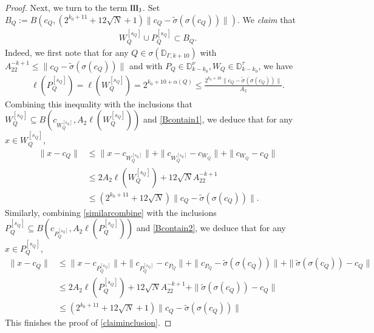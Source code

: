 \documentclass[12pt]{amsart}
\begin{document}
\begin{proof}
Next, we turn to the term ${\rm III}_3$. Set $B_Q:=B(c_Q,(2^{k_0+11}+12\sqrt{N}+1)\|c_Q-\widetilde{\sigma}(\sigma(c_Q))\|)$. We {\it claim} that
\begin{align}\label{claiminclusion}
  W_Q^{[s_Q]}\cup P_Q^{[s_Q]}\subset B_Q.
\end{align}
Indeed, we first note that for any $Q\in\sigma(\mathbb{D}_{\Gamma,k+10})$ with $ A_22^{-k+1}\leq \|c_Q-\widetilde{\sigma}(\sigma(c_Q))\|$ and with $ P_Q\in\mathbb{D}_{k-k_0}^\nu,W_Q\in\mathbb{D}_{k-k_0}^\tau$, we have
\begin{align}\label{similarcombine}
  \ell(P_Q^{[s_Q]})=\ell(W_Q^{[s_Q]})=2^{k_0+10+\alpha(Q)}\leq\frac{2^{k_0+10}\|c_Q-\widetilde{\sigma}(\sigma(c_Q))\|}{A_2}.
\end{align}
Combining this inequality with the inclusions that $W_{Q}^{[s_Q]}\subseteq B(c_{W_Q^{[s_Q]}},A_2\ell(W_Q^{[s_Q]}))$ and \eqref{Bcontain1}, we deduce that for any $x\in W_{Q}^{[s_Q]}$,
\begin{align*}
\|x-c_Q\|
&\leq \|x-c_{W_Q^{[s_Q]}}\|+\|c_{W_Q^{[s_Q]}}-c_{W_Q}\|+\|c_{W_Q}-c_Q\|\\
&\leq 2A_2\ell(W_Q^{[s_Q]})+12\sqrt{N}A_22^{-k+1}\\
&\leq (2^{k_0+11}+12\sqrt{N}) \|c_Q-\widetilde{\sigma}(\sigma(c_Q))\|.
\end{align*}
Similarly, combining \eqref{similarcombine} with the inclusions $P_Q^{[s_Q]}\subseteq B(c_{P_Q^{[s_Q]}},A_2\ell(P_Q^{[s_Q]}))$ and \eqref{Bcontain2}, we deduce that for any $x\in P_Q^{[s_Q]}$,
\begin{align*}
  \|x-c_Q\|
  &\leq \|x-c_{P_Q^{[s_Q]}}\|+\|c_{P_Q^{[s_Q]}}-c_{P_Q}\|+\|c_{P_Q}-\widetilde{\sigma}(\sigma(c_Q))\|+\|\widetilde{\sigma}(\sigma(c_Q))-c_Q\|\\
  &\leq 2A_2\ell(P_Q^{[s_Q]})+12\sqrt{N}A_22^{-k+1}+\|\widetilde{\sigma}(\sigma(c_Q))-c_Q\|\\
  &\leq (2^{k_0+11}+12\sqrt{N}+1) \|c_Q-\widetilde{\sigma}(\sigma(c_Q))\|
\end{align*}
This finishes the proof of \eqref{claiminclusion}.


\end{proof}
\end{document}
